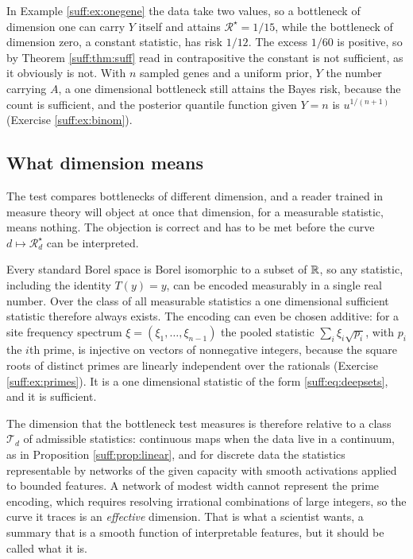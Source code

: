 \begin{example}
\label{suff:ex:onegene2}
In Example \ref{suff:ex:onegene} the data take two values, so a bottleneck of dimension one
can carry $Y$ itself and attains $\mathcal{R}^\star=1/15$, while the bottleneck of dimension
zero, a constant statistic, has risk $1/12$. The excess $1/60$ is positive, so by Theorem
\ref{suff:thm:suff} read in contrapositive the constant is not sufficient, as it obviously is
not. With $n$ sampled genes and a uniform prior, $Y$ the number carrying $A$, a one dimensional
bottleneck still attains the Bayes risk, because the count is sufficient, and the posterior
quantile function given $Y=n$ is $u^{1/(n+1)}$ (Exercise \ref{suff:ex:binom}).
\end{example}

\subsection{What dimension means}

The test compares bottlenecks of different dimension, and a reader trained in measure theory
will object at once that dimension, for a measurable statistic, means nothing. The objection
is correct and has to be met before the curve $d\mapsto\mathcal{R}^\star_d$ can be
interpreted.

\begin{remark}
\label{suff:rem:dimension}
Every standard Borel space is Borel isomorphic to a subset of $\mathbb{R}$, so any statistic,
including the identity $T(y)=y$, can be encoded measurably in a single real number. Over the
class of all measurable statistics a one dimensional sufficient statistic therefore always
exists. The encoding can even be chosen additive: for a site frequency spectrum
$\xi=(\xi_1,\dots,\xi_{n-1})$ the pooled statistic $\sum_i \xi_i\sqrt{p_i}$, with $p_i$ the
$i$th prime, is injective on vectors of nonnegative integers, because the square roots of
distinct primes are linearly independent over the rationals (Exercise \ref{suff:ex:primes}).
It is a one dimensional statistic of the form \eqref{suff:eq:deepsets}, and it is sufficient.

The dimension that the bottleneck test measures is therefore relative to a class
$\mathcal{T}_d$ of admissible statistics: continuous maps when the data live in a continuum,
as in Proposition \ref{suff:prop:linear}, and for discrete data the statistics representable
by networks of the given capacity with smooth activations applied to bounded features. A
network of modest width cannot represent the prime encoding, which requires resolving
irrational combinations of large integers, so the curve it traces is an \emph{effective}
dimension. That is what a scientist wants, a summary that is a smooth function of interpretable
features, but it should be called what it is.
\end{remark}

